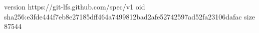 version https://git-lfs.github.com/spec/v1
oid sha256:e3fde444f7eb8e27185dff464a7499812bad2afe52742597ad52fa23106dafac
size 87544
